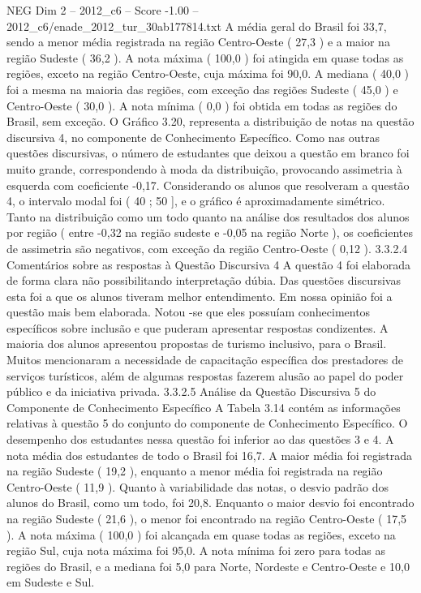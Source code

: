 \begin{textsample}{NEG Dim 2 – 2012\_c6 – Score -1.00 – 2012\_c6/enade\_2012\_tur\_30ab177814.txt}
A média geral do Brasil foi 33,7, sendo a menor média registrada na região Centro-Oeste ( 27,3 ) e a maior na região Sudeste ( 36,2 ).
A nota máxima ( 100,0 ) foi atingida em quase todas as regiões, exceto na região Centro-Oeste, cuja máxima foi 90,0.
A mediana ( 40,0 ) foi a mesma na maioria das regiões, com exceção das regiões Sudeste ( 45,0 ) e Centro-Oeste ( 30,0 ).
A nota mínima ( 0,0 ) foi obtida em todas as regiões do Brasil, sem exceção.
O Gráfico 3.20, representa a distribuição de notas na questão discursiva 4, no componente de Conhecimento Específico.
Como nas outras questões discursivas, o número de estudantes que deixou a questão em branco foi muito grande, correspondendo à moda da distribuição, provocando assimetria à esquerda com coeficiente -0,17.
Considerando os alunos que resolveram a questão 4, o intervalo modal foi ( 40 ; 50 ], e o gráfico é aproximadamente simétrico.
Tanto na distribuição como um todo quanto na análise dos resultados dos alunos por região ( entre -0,32 na região sudeste e -0,05 na região Norte ), os coeficientes de assimetria são negativos, com exceção da região Centro-Oeste ( 0,12 ). 3.3.2.4 Comentários sobre as respostas à Questão Discursiva 4 A questão 4 foi elaborada de forma clara não possibilitando interpretação dúbia.
Das questões discursivas esta foi a que os alunos tiveram melhor entendimento.
Em nossa opinião foi a questão mais bem elaborada.
Notou -se que eles possuíam conhecimentos específicos sobre inclusão e que puderam apresentar respostas condizentes.
A maioria dos alunos apresentou propostas de turismo inclusivo, para o Brasil.
Muitos mencionaram a necessidade de capacitação específica dos prestadores de serviços turísticos, além de algumas respostas fazerem alusão ao papel do poder público e da iniciativa privada. 3.3.2.5 Análise da Questão Discursiva 5 do Componente de Conhecimento Específico A Tabela 3.14 contém as informações relativas à questão 5 do conjunto do componente de Conhecimento Específico.
O desempenho dos estudantes nessa questão foi inferior ao das questões 3 e 4.
A nota média dos estudantes de todo o Brasil foi 16,7.
A maior média foi registrada na região Sudeste ( 19,2 ), enquanto a menor média foi registrada na região Centro-Oeste ( 11,9 ).
Quanto à variabilidade das notas, o desvio padrão dos alunos do Brasil, como um todo, foi 20,8.
Enquanto o maior desvio foi encontrado na região Sudeste ( 21,6 ), o menor foi encontrado na região Centro-Oeste ( 17,5 ).
A nota máxima ( 100,0 ) foi alcançada em quase todas as regiões, exceto na região Sul, cuja nota máxima foi 95,0.
A nota mínima foi zero para todas as regiões do Brasil, e a mediana foi 5,0 para Norte, Nordeste e Centro-Oeste e 10,0 em Sudeste e Sul.

\end{textsample}
